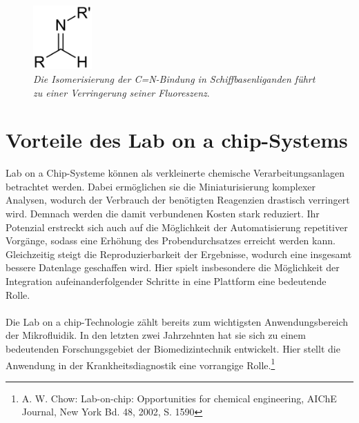 \documentclass[12pt,a4paper]{report}
\begin{document}
	\begin{figure}[h!]
		\centering
		\includegraphics[width=0.2\textwidth]{SchiffscheBase.png}
		\caption{\textnormal{\textit{Die Isomerisierung der C=N-Bindung in Schiffbasenliganden führt zu einer Verringerung seiner Fluoreszenz}.}} 
		\label{fig:Schiffsche Base}
	\end{figure}
	\section{Vorteile des Lab on a chip-Systems}
	Lab on a Chip-Systeme können als verkleinerte chemische Verarbeitungsanlagen betrachtet werden. Dabei ermöglichen sie die Miniaturisierung komplexer Analysen, wodurch der Verbrauch der benötigten  Reagenzien drastisch verringert wird. Demnach werden die damit verbundenen Kosten stark reduziert. Ihr Potenzial erstreckt sich auch auf die Möglichkeit der Automatisierung repetitiver Vorgänge, sodass eine Erhöhung des Probendurchsatzes erreicht werden kann. Gleichzeitig steigt die Reproduzierbarkeit der Ergebnisse, wodurch eine insgesamt bessere Datenlage geschaffen wird. Hier spielt insbesondere die Möglichkeit der Integration aufeinanderfolgender Schritte in eine Plattform eine bedeutende Rolle.\\
	\ \\
	Die Lab on a chip-Technologie zählt bereits zum wichtigsten Anwendungsbereich der Mikrofluidik. In den letzten zwei Jahrzehnten hat sie sich zu einem bedeutenden Forschungsgebiet der Biomedizintechnik entwickelt. Hier stellt die Anwendung in der Krankheitsdiagnostik eine vorrangige Rolle.\footnote{A. W. Chow: Lab-on-chip: Opportunities for chemical engineering, AIChE Journal, New York Bd. 48, 2002, S. 1590}
\end{document}
